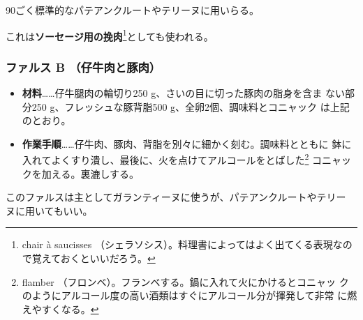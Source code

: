 \begin{recette}
90ごく標準的なパテアンクルートやテリーヌに用いらる。

これは\textbf{ソーセージ用の挽肉}\footnote{chair à saucisses
  （シェラソシス）。料理書によってはよく出てくる表現なので覚えておくといいだろう。}としても使われる。

\maeaki

\hypertarget{farce-froide-b}{%
\subsubsection{ファルス B （仔牛肉と豚肉）}\label{farce-froide-b}}



\begin{itemize}
\item
  \textbf{材料}\ldots{}\ldots{}仔牛腿肉の輪切り250
  g、さいの目に切った豚肉の脂身を含ま ない部分250
  g、フレッシュな豚背脂500 g、全卵2個、調味料とコニャック
  は上記のとおり。
\item
  \textbf{作業手順}\ldots{}\ldots{}仔牛肉、豚肉、背脂を別々に細かく刻む。調味料とともに
  鉢に入れてよくすり潰し、最後に、火を点けてアルコールをとばした\footnote{flamber
    （フロンベ）。フランベする。鍋に入れて火にかけるとコニャッ
    クのようにアルコール度の高い酒類はすぐにアルコール分が揮発して非常
    に燃えやすくなる。} コニャックを加える。裏漉しする。
\end{itemize}

このファルスは主としてガランティーヌに使うが、パテアンクルートやテリー
ヌに用いてもいい。
\end{recette}